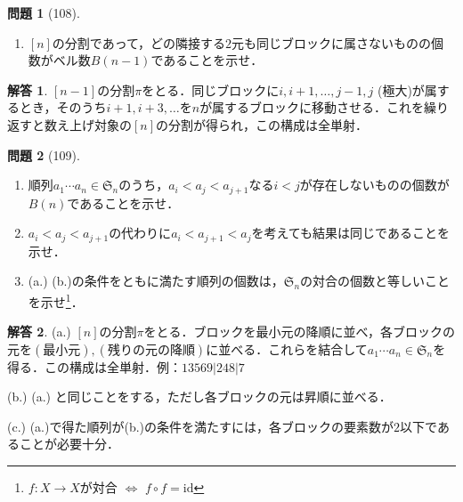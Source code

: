 \documentclass[xelatex,ja=standard,a4paper,14pt,everyparhook=compat]{bxjsarticle}
\newcommand{\frakS}{\mathfrak{S}}
\theoremstyle{definition}
\newtheorem*{problem}{問題}
\newtheorem*{answer}{解答}
\begin{document}
\begin{problem}[108]
    \begin{enumerate}
        \item $[n]$の分割であって，どの隣接する$2$元も同じブロックに属さないものの個数がベル数$B(n-1)$であることを示せ．
    \end{enumerate}
\end{problem}
\begin{answer}
    $[n-1]$の分割$\pi$をとる．同じブロックに$i,i+1,\ldots,j-1,j$ (極大)が属するとき，そのうち$i+1,i+3,\ldots$を$n$が属するブロックに移動させる．これを繰り返すと数え上げ対象の$[n]$の分割が得られ，この構成は全単射．
\end{answer}

\begin{problem}[109]
    \begin{enumerate}
        \item 順列$a_1 \cdots a_n \in \frakS_n$のうち，$a_i < a_j < a_{j+1}$なる$i < j$が存在しないものの個数が$B(n)$であることを示せ．
        \item $a_i < a_j < a_{j+1}$の代わりに$a_i < a_{j+1} < a_j$を考えても結果は同じであることを示せ．
        \item (a.) (b.)の条件をともに満たす順列の個数は，$\frakS_n$の対合の個数と等しいことを示せ\footnote{$f : X \to X$が対合 $\iff$ $f \circ f = \mathrm{id}$}．
    \end{enumerate}
\end{problem}
\begin{answer}
    (a.) $[n]$の分割$\pi$をとる．ブロックを最小元の降順に並べ，各ブロックの元を$(\text{最小元}),(\text{残りの元の降順})$に並べる．これらを結合して$a_1\cdots a_n \in \frakS_n$を得る．この構成は全単射．例：$13569|248|7$

    (b.) (a.) と同じことをする，ただし各ブロックの元は昇順に並べる．

    (c.) (a.)で得た順列が(b.)の条件を満たすには，各ブロックの要素数が$2$以下であることが必要十分．
\end{answer}
\end{document}
